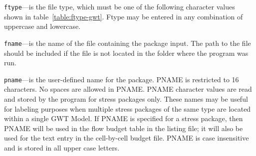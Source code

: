 \begin{description}
\item \texttt{ftype}---is the file type, which must be one of the following character values shown in table~\ref{table:ftype-gwt}. Ftype may be entered in any combination of uppercase and lowercase.

\item \texttt{fname}---is the name of the file containing the package input.  The path to the file should be included if the file is not located in the folder where the program was run.

\item \texttt{pname}---is the user-defined name for the package. PNAME is restricted to 16 characters.  No spaces are allowed in PNAME.  PNAME character values are read and stored by the program for stress packages only.  These names may be useful for labeling purposes when multiple stress packages of the same type are located within a single GWT Model.  If PNAME is specified for a stress package, then PNAME will be used in the flow budget table in the listing file; it will also be used for the text entry in the cell-by-cell budget file.  PNAME is case insensitive and is stored in all upper case letters.

\end{description}

